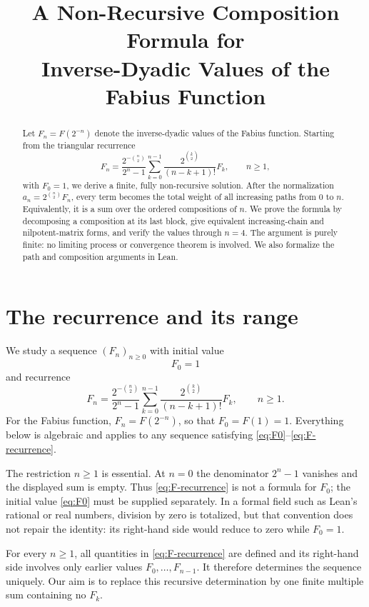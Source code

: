 \documentclass[11pt]{article}
\title{A Non-Recursive Composition Formula for\\
Inverse-Dyadic Values of the Fabius Function}
\author{}
\date{}
\theoremstyle{definition}
\theoremstyle{remark}
\begin{document}
\maketitle

\begin{abstract}
Let $F_n=F(2^{-n})$ denote the inverse-dyadic values of the Fabius
function.  Starting from the triangular recurrence
\[
 F_n=\frac{2^{-\binom n2}}{2^n-1}
 \sum_{k=0}^{n-1}
 \frac{2^{\binom k2}}{(n-k+1)!}F_k,
 \qquad n\geq 1,
\]
with $F_0=1$, we derive a finite, fully non-recursive solution.  After the
normalization $a_n=2^{\binom n2}F_n$, every term becomes the total weight of
all increasing paths from $0$ to $n$.  Equivalently, it is a sum over the
ordered compositions of $n$.  We prove the formula by decomposing a
composition at its last block, give equivalent increasing-chain and
nilpotent-matrix forms, and verify the values through $n=4$.  The argument is
purely finite: no limiting process or convergence theorem is involved.  We
also formalize the path and composition arguments in Lean.
\end{abstract}

\section{The recurrence and its range}

We study a sequence $(F_n)_{n\geq 0}$ with initial value
\begin{equation}\label{eq:F0}
 F_0=1
\end{equation}
and recurrence
\begin{equation}\label{eq:F-recurrence}
 F_n=\frac{2^{-\binom n2}}{2^n-1}
 \sum_{k=0}^{n-1}
 \frac{2^{\binom k2}}{(n-k+1)!}F_k,
 \qquad n\geq 1.
\end{equation}
For the Fabius function, $F_n=F(2^{-n})$, so that $F_0=F(1)=1$.
Everything below is algebraic and applies to any sequence satisfying
\eqref{eq:F0}--\eqref{eq:F-recurrence}.

The restriction $n\geq1$ is essential.  At $n=0$ the denominator $2^n-1$
vanishes and the displayed sum is empty.  Thus \eqref{eq:F-recurrence} is
not a formula for $F_0$; the initial value \eqref{eq:F0} must be supplied
separately.  In a formal field such as Lean's rational or real numbers,
division by zero is totalized, but that convention does not repair the
identity: its right-hand side would reduce to zero while $F_0=1$.

For every $n\geq1$, all quantities in \eqref{eq:F-recurrence} are defined
and its right-hand side involves only earlier values $F_0,\ldots,F_{n-1}$.
It therefore determines the sequence uniquely.  Our aim is to replace this
recursive determination by one finite multiple sum containing no $F_k$.
\end{document}
